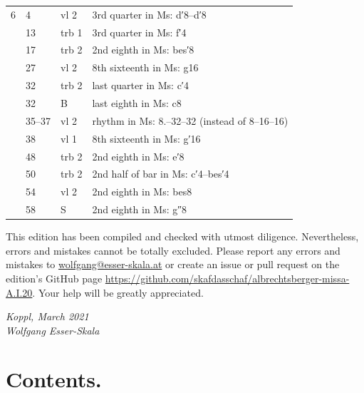\documentclass[parskip=full]{scrreprt}
\newif\iftemplate\templatetrue
\begin{document}
\begin{longtable}{lll L{10cm}}
	6 & 4   & vl 2     & 3rd quarter in Ms: d′8–d′8 \\
	  & 13  & trb 1    & 3rd quarter in Ms: f′4 \\
	  & 17  & trb 2    & 2nd eighth in Ms: bes′8 \\
	  & 27  & vl 2     & 8th sixteenth in Ms: g16 \\
	  & 32  & trb 2    & last quarter in Ms: c′4 \\
	  & 32  & B        & last eighth in Ms: c8 \\
	  & 35–37 & vl 2   & rhythm in Ms: 8.–32–32 (instead of 8–16–16) \\
	  & 38  & vl 1     & 8th sixteenth in Ms: g′16 \\
	  & 48  & trb 2    & 2nd eighth in Ms: e′8 \\
	  & 50  & trb 2    & 2nd half of bar in Ms: c′4–bes′4 \\
	  & 54  & vl 2     & 2nd eighth in Ms: bes8 \\
	  & 58  & S        & 2nd eighth in Ms: g″8 \\
	\bottomrule
\end{longtable}


This edition has been compiled and checked with utmost diligence. Nevertheless, errors and mistakes cannot be totally excluded. Please report any errors and mistakes to \url{wolfgang@esser-skala.at} or create an issue or pull request on the edition’s GitHub page \url{https://github.com/skafdasschaf/albrechtsberger-missa-A.I.20}. Your help will be greatly appreciated.

\bigskip
\textit{Koppl, March 2021\\
Wolfgang Esser-Skala}

\cleardoublepage
\chapter*{Contents.}



\cleardoublepage
\fi

\iftemplate

\fi
\end{document}
